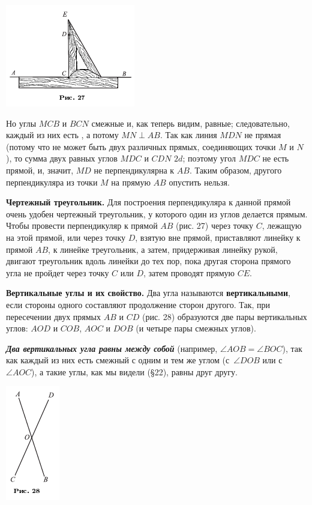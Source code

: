 \documentclass[oneside]{book}
\begin{document}
\includegraphics{pics/ris-27}

Но углы $MCB$ и $BCN$ смежные и, как теперь видим, равные;
следовательно, каждый из них есть , а потому $MN\perp AB$.
Так как линия $MDN$ не прямая (потому что не может быть двух различных прямых, соединяющих точки $M$ и $N$), то сумма двух равных углов $MDC$ и $CDN$  $2d$;
поэтому угол $MDC$ не есть прямой, и, значит, $MD$ не перпендикулярна к $AB$.
Таким образом, другого перпендикуляра из точки $M$ на прямую $AB$ опустить нельзя.

\textbf{Чертежный треугольник.}
Для построения перпендикуляра к данной прямой очень удобен чертежный треугольник, у которого один из углов делается прямым.
Чтобы провести перпендикуляр к прямой $AB$ (рис. 27) через точку $C$, лежащую на этой прямой, или через точку $D$, взятую вне прямой, приставляют линейку к прямой $AB$, к линейке треугольник, а затем, придерживая линейку рукой, двигают треугольник вдоль линейки до тех пор, пока другая сторона прямого угла не пройдет через точку $C$ или $D$, затем проводят прямую $CE$.


\textbf{Вертикальные углы и их свойство.}
Два угла называются \textbf{вертикальными}, если стороны одного составляют продолжение сторон другого.
Так, при пересечении двух прямых $AB$ и $CD$ (рис. 28) образуются две пары вертикальных углов:
$AOD$ и $COB$, $AOC$ и $DOB$ (и четыре пары смежных углов).

\textbf{\emph{Два вертикальных угла равны между собой}} (например, $\angle AOB = \angle BOC$), так как каждый из них есть смежный с одним и тем же углом (с~$\angle DOB$ или с~$\angle AOC$), а такие углы, как мы видели (§22), равны друг другу.

\includegraphics{pics/ris-28}
\end{document}
